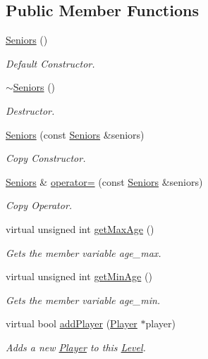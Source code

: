 \subsection*{Public Member Functions}
\begin{DoxyCompactItemize}
\item 
\hyperlink{class_seniors_ae02d7a048872847e295db59af893798a}{Seniors} ()
\begin{DoxyCompactList}\small\item\em Default Constructor. \end{DoxyCompactList}\item 
\hyperlink{class_seniors_a3063e1ce430ade54ec6b7a41a51bf942}{$\sim$\+Seniors} ()
\begin{DoxyCompactList}\small\item\em Destructor. \end{DoxyCompactList}\item 
\hyperlink{class_seniors_afb61156464d704b00aff866de6ee727a}{Seniors} (const \hyperlink{class_seniors}{Seniors} \&seniors)
\begin{DoxyCompactList}\small\item\em Copy Constructor. \end{DoxyCompactList}\item 
\hyperlink{class_seniors}{Seniors} \& \hyperlink{class_seniors_a6ec55b45cb67c34004c38a36fc3f8e64}{operator=} (const \hyperlink{class_seniors}{Seniors} \&seniors)
\begin{DoxyCompactList}\small\item\em Copy Operator. \end{DoxyCompactList}\item 
virtual unsigned int \hyperlink{class_seniors_a856a5d37a9dbda1e1b3ad8eb90db1f2a}{get\+Max\+Age} ()
\begin{DoxyCompactList}\small\item\em Gets the member variable age\+\_\+max. \end{DoxyCompactList}\item 
virtual unsigned int \hyperlink{class_seniors_a1843edaf8811f4728f76c11c79fe5450}{get\+Min\+Age} ()
\begin{DoxyCompactList}\small\item\em Gets the member variable age\+\_\+min. \end{DoxyCompactList}\item 
virtual bool \hyperlink{class_seniors_a4ee5683212625ee909b5c04d08bc8823}{add\+Player} (\hyperlink{class_player}{Player} $\ast$player)
\begin{DoxyCompactList}\small\item\em Adds a new \hyperlink{class_player}{Player} to this \hyperlink{class_level}{Level}. \end{DoxyCompactList}\item 

\end{DoxyCompactItemize}
